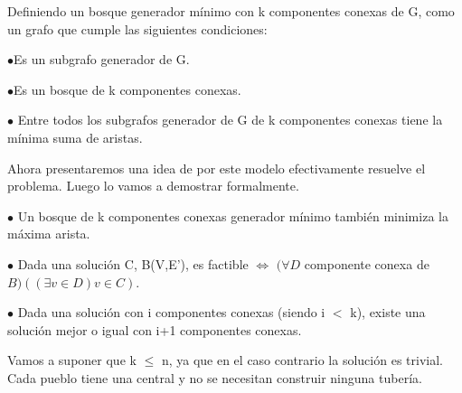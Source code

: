 Definiendo un bosque generador mínimo con k componentes conexas de G, como un grafo que cumple las siguientes condiciones:

$\bullet$Es un subgrafo generador de G. 

$\bullet$Es un bosque de k componentes conexas.

$\bullet$ Entre todos los subgrafos generador de G de k componentes conexas tiene la mínima suma de aristas.

Ahora presentaremos una idea de por este modelo efectivamente resuelve el problema. Luego lo vamos a demostrar formalmente. 

$\bullet$ Un bosque de k componentes conexas generador mínimo también minimiza la máxima arista.

$\bullet$ Dada una solución C, B(V,E'), es factible $\Longleftrightarrow$ $(\forall D$ componente conexa de $B)((\exists v \in D) v \in C)$.  

$\bullet$ Dada una solución con i componentes conexas (siendo i $<$ k), existe una solución mejor o igual con i+1 componentes conexas.

Vamos a suponer que k $\leq$ n, ya que en el caso contrario la solución es trivial. Cada pueblo tiene una central y no se necesitan construir ninguna tubería.